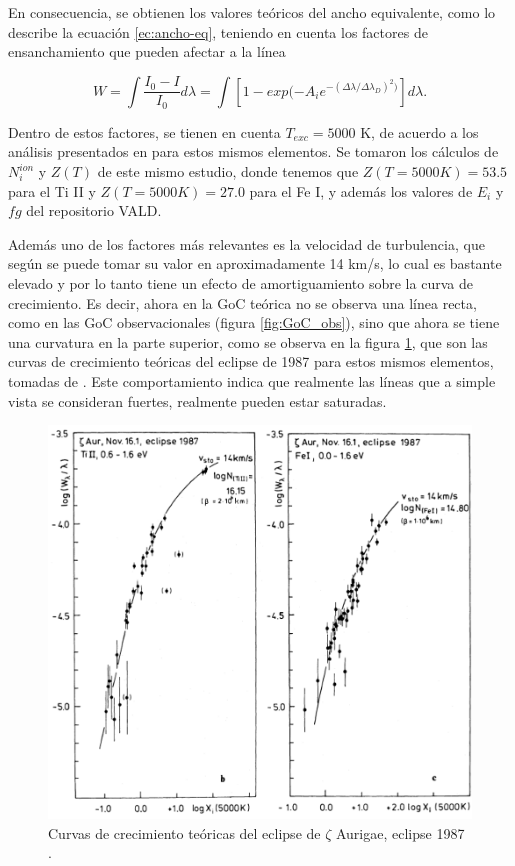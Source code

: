 \documentclass[12pt,oneside,openany,letter]{book}
\begin{document}
En consecuencia, se obtienen los valores teóricos del ancho equivalente, como lo describe la ecuación \ref{ec:ancho-eq}, teniendo en cuenta los factores de ensanchamiento que pueden afectar a la línea

\begin{equation}
    W = \int \frac{I_0 - I}{I_0}d \lambda = \int \left[1 - exp(-A_i e^{-(\Delta\lambda/\Delta\lambda_D)^2)}\right] d\lambda.
    \label{ec:ancho-eq}
\end{equation}

Dentro de estos factores, se tienen en cuenta $T_{exc} = 5000$ K, de acuerdo a los análisis presentados en \citet{kps1O} para estos mismos elementos. Se tomaron los cálculos  de $N_i^{ion}$ y $Z(T)$ de este mismo estudio, donde tenemos que $Z(T=5000K) = 53.5$ para el Ti II y  $Z(T=5000K) = 27.0$ para el Fe I, y además los valores de $E_i$ y $fg$ del repositorio VALD. 

Además uno de los factores más relevantes es la velocidad de turbulencia, que según \citet{kps1O} se puede tomar su valor en aproximadamente 14 km/s, lo cual es bastante elevado y por lo tanto tiene un efecto de amortiguamiento sobre la curva de crecimiento. Es decir, ahora en la GoC teórica no se observa una línea recta, como en las GoC observacionales (figura \ref{fig:GoC_obs}), sino que ahora se tiene una curvatura en la parte superior, como se observa en la figura \ref{fig:cteoricas_klaus}, que son las curvas de crecimiento teóricas del eclipse de 1987 para estos mismos elementos, tomadas de \citet{kps1O}. Este comportamiento indica que realmente las líneas que a simple vista se consideran fuertes, realmente pueden estar saturadas.



\begin{figure}[h]
    \centering
    \includegraphics[width=0.8\linewidth]{Gaficas/curvas_klaus.png}
    \caption{Curvas de crecimiento teóricas del eclipse de $\zeta$ Aurigae, eclipse 1987 \citep{kps1O}.}
    \label{fig:cteoricas_klaus}
\end{figure}
\end{document}
